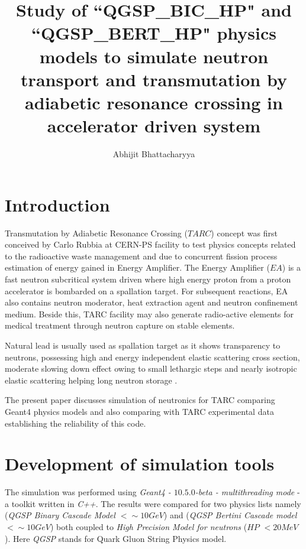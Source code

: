 \documentclass[twocolumn,amsmath,amssymb]{snp}
\begin{document}
\title{{\Large Study of ``QGSP\_BIC\_HP" and ``QGSP\_BERT\_HP" physics models to simulate neutron transport and transmutation by adiabetic resonance crossing in accelerator driven system }}%

\author{\large Abhijit Bhattacharyya}


\maketitle


\section*{Introduction}
Transmutation by Adiabetic Resonance Crossing ($TARC$) \cite {ps211, tarcNIM} concept was first conceived by Carlo Rubbia at CERN-PS facility to test physics concepts related to the radioactive waste management and due to concurrent fission process estimation of energy gained in Energy Amplifier. The Energy Amplifier ($EA$) \cite {ps211, tarcNIM} is a fast neutron subcritical system driven where high energy proton from a proton accelerator is bombarded on a spallation target. For subsequent reactions, EA also contains neutron moderator, heat extraction agent and neutron confinement medium. Beside this, TARC facility may also generate radio-active elements for medical treatment through neutron capture on stable elements.

Natural lead is usually used as spallation target as it shows transparency to neutrons, possessing high and energy independent elastic scattering cross section, moderate slowing down effect owing to small lethargic steps and nearly isotropic elastic scattering helping long neutron storage \cite {ps211, tarcNIM}.

The present paper discusses simulation of neutronics for TARC comparing Geant4 physics models and also comparing with TARC experimental data establishing the reliability of this code. 

\section*{Development of simulation tools}
The simulation was performed using \textsl{Geant4 - $10.5.0$-{\it{beta}} - multithreading mode} - a toolkit written in \textit{C++}. The results were compared for two physics lists namely (\textit{QGSP Binary Cascade Model $<\sim 10 GeV$}) and (\textit{QGSP Bertini Cascade model $< \sim 10 GeV$}) both coupled to \textit{High Precision Model for neutrons} ($HP$ $<20 MeV$). Here \textit{QGSP} stands for Quark Gluon String Physics model.
\end{document}

